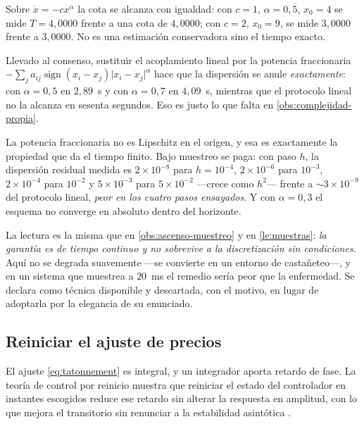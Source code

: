 \begin{observacion}
\label{obs:tiempo-finito-num}
Sobre $\dot x=-cx^{\alpha}$ la cota se alcanza con igualdad: con $c=1$,
$\alpha=0{,}5$, $x_0=4$ se mide $T=4{,}0000$ frente a una cota de $4{,}0000$; con
$c=2$, $x_0=9$, se mide $3{,}0000$ frente a $3{,}0000$. No es una estimación
conservadora sino el tiempo exacto.

Llevado al consenso, sustituir el acoplamiento lineal por la potencia fraccionaria
$-\sum_j a_{ij}\operatorname{sign}(x_i-x_j)\lvert x_i-x_j\rvert^{\alpha}$ hace que
la dispersión se anule \emph{exactamente}: con $\alpha=0{,}5$ en $2{,}89$~s y con
$\alpha=0{,}7$ en $4{,}09$~s, mientras que el protocolo lineal no la alcanza en
sesenta segundos. Eso es justo lo que falta en \cref{obs:complejidad-propia}.
\end{observacion}

\begin{observacion}
\label{obs:tiempo-finito-precio}
La potencia fraccionaria no es Lipschitz en el origen, y esa es exactamente la
propiedad que da el tiempo finito. Bajo muestreo se paga: con paso $h$, la
dispersión residual medida es $2\times10^{-8}$ para $h=10^{-4}$,
$2\times10^{-6}$ para $10^{-3}$, $2\times10^{-4}$ para $10^{-2}$ y
$5\times10^{-3}$ para $5\times10^{-2}$ —crece como $h^{2}$— frente a
$\sim3\times10^{-9}$ del protocolo lineal, \emph{peor en los cuatro pasos
ensayados}. Y con $\alpha=0{,}3$ el esquema no converge en absoluto dentro del
horizonte.

La lectura es la misma que en \cref{obs:ascenso-muestreo} y en
\cref{le:muestras}: \emph{la garantía es de tiempo continuo y no
sobrevive a la discretización sin condiciones}. Aquí no se degrada suavemente
—se convierte en un entorno de castañeteo—, y en un sistema que muestrea a
$20$~ms el remedio sería peor que la enfermedad. Se declara como técnica
disponible y descartada, con el motivo, en lugar de adoptarla por la elegancia
de su enunciado.
\end{observacion}

\subsection{Reiniciar el ajuste de precios}

El ajuste \eqref{eq:tatonnement} es integral, y un integrador aporta retardo de
fase. La teoría de control por reinicio muestra que reiniciar el estado del
controlador en instantes escogidos reduce ese retardo sin alterar la respuesta
en amplitud, con lo que mejora el transitorio sin renunciar a la estabilidad
asintótica \cite{zhao2024hybrid}.

